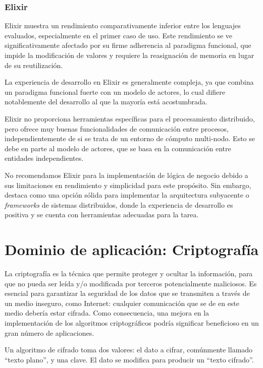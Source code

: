 \documentclass[11pt]{article}
\let\Oldsection\section
\renewcommand{\section}{\FloatBarrier\Oldsection}
\let\Oldsubsubsection\subsubsection
\renewcommand{\subsubsection}{\FloatBarrier\Oldsubsubsection}
\begin{document}
\subsubsection{Elixir}

Elixir muestra un rendimiento comparativamente inferior entre los lenguajes evaluados, especialmente en el primer caso de uso. Este rendimiento se ve significativamente afectado por su firme adherencia al paradigma funcional, que impide la modificación de valores y requiere la reasignación de memoria en lugar de su reutilización.

La experiencia de desarrollo en Elixir es generalmente compleja, ya que combina un paradigma funcional fuerte con un modelo de actores, lo cual difiere notablemente del desarrollo al que la mayoría está acostumbrada.

Elixir no proporciona herramientas específicas para el procesamiento distribuido, pero ofrece muy buenas funcionalidades de comunicación entre procesos, independientemente de si se trata de un entorno de cómputo multi-nodo. Esto se debe en parte al modelo de actores, que se basa en la comunicación entre entidades independientes.

No recomendamos Elixir para la implementación de lógica de negocio debido a sus limitaciones en rendimiento y simplicidad para este propósito. Sin embargo, destaca como una opción sólida para implementar la arquitectura subyacente o \textit{frameworks} de sistemas distribuidos, donde la experiencia de desarrollo es positiva y se cuenta con herramientas adecuadas para la tarea.

\newpage

\section{Dominio de aplicación: Criptografía}

La criptografía es la técnica que permite proteger y ocultar la información, para que no pueda ser leída y/o modificada por terceros potencialmente maliciosos. Es esencial para garantizar la seguridad de los datos que se transmiten a través de un medio inseguro, como Internet: cualquier comunicación que se de en este medio debería estar cifrada. Como consecuencia, una mejora en la implementación de los algoritmos criptográficos podría significar beneficioso en un gran número de aplicaciones.

Un algoritmo de cifrado toma dos valores: el dato a cifrar, comúnmente llamado ``texto plano'', y una clave. El dato se modifica para producir un ``texto cifrado''.
\end{document}

